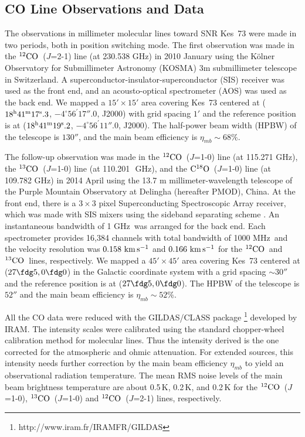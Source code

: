 \documentclass[12pt,preprint]{aastex}
\newcommand{\RA}[3]{{#1}^{{\rm h}}{#2}^{{\rm m}}{#3}^{\rm s}}
\newcommand{\decl}[3]{{#1}^{\circ}{#2}^{\prime}{#3}''}
\newcommand{\kms}{\,{\km\ps}}       \newcommand{\m}{\,{\rm m}}
\newcommand{\MHz}{\,{\rm MHz}}  \newcommand{\kHz}{\,{\rm kHz}}
\newcommand{\GHz}{\,{\rm GHz}}  \newcommand{\ks}{\,{\rm ksec}}
\newcommand{\twCO}{$^{12}{\rm CO}$}
\newcommand{\thCO}{$^{13}{\rm CO}$}
\newcommand{\eiCO}{${\rm C}^{18}{\rm O}$}
\newcommand{\Jotz}{$J$=1-0}
\newcommand{\Jtto}{$J$=2-1}
\begin{document}
\subsection{CO Line Observations and Data}
The observations in millimeter molecular lines
toward SNR Kes~73 were made  in two periods,  
both in position switching mode.
The first observation was made in the  \twCO~(\Jtto) line (at 
230.538\,\GHz) in 2010 January using the K\"{o}lner Observatory 
for Submillimeter Astronomy (KOSMA) 3m submillimeter telescope in Switzerland.
A superconductor-insulator-superconductor (SIS) receiver 
was used as the front end, and 
an acousto-optical spectrometer (AOS) was used as the back end. 
We mapped a $15'\times15'$ area covering Kes~73 centered at
($\RA{18}{41}{17}.3$, $\decl{-4}{56}{17}.0$, J2000) 
with grid spacing $1'$ and the reference position is at  
($\RA{18}{41}{19}.2$, $\decl{-4}{56}{11}.0$, J2000).
The half-power beam width (HPBW) of the telescope  %
is $130''$, and the main beam efficiency is $\eta_{mb}\sim68\%$. 

The follow-up observation was made in the \twCO~(\Jotz) line (at 115.271\,\GHz),
the \thCO~(\Jotz) line (at 110.201~\GHz), and the \eiCO~(\Jotz) line (at 109.782\,\GHz)
in 2014 April using the 13.7 m millimeter-wavelength
telescope of the Purple Mountain Observatory at Delingha (hereafter
PMOD), China.  %
At the front end, there is a $3\times3$ pixel Superconducting Spectroscopic Array 
receiver, which was made with SIS mixers using the sideband separating scheme 
\citep{Zuo2011Delinha,Shan2012}. 
An instantaneous bandwidth of 1\,\GHz\ was arranged for the back end. 
Each spectrometer provides 16,384 channels with total bandwidth of 1000\,\MHz\ 
and the velocity resolution was $0.158\kms$ and $0.166\kms$ for the \twCO\
and  \thCO\  lines, respectively. %
We mapped a $45'\times45'$ area covering Kes~73 centered at ($27\fdg5,0\fdg0$) 
in the Galactic coordinate system with a grid spacing $\sim 30''$ 
and the reference position is at ($27\fdg5,0\fdg0$).
The HPBW of the telescope is  $52''$ and
the main beam efficiency is $\eta_{mb}\sim52\%$. 

All the CO data were reduced with the GILDAS/CLASS package
\footnote{http://www.iram.fr/IRAMFR/GILDAS} developed by IRAM.
The intensity scales were calibrated using  the standard chopper-wheel 
calibration method \citep[e.g.,][]{Ulich1976} for molecular lines.
Thus the intensity  derived is the one corrected for the atmospheric and ohmic attenuation. 
For extended sources, this intensity needs further correction by the main beam efficiency 
$\eta_{mb}$ to yield an observational radiation temperature.
The mean RMS noise levels of the main beam brightness temperature 
are about 0.5\,K, 0.2\,K, and 0.2\,K for the \twCO~(\Jotz), \thCO~(\Jotz)
and \twCO~(\Jtto)  lines, respectively.
\end{document}
